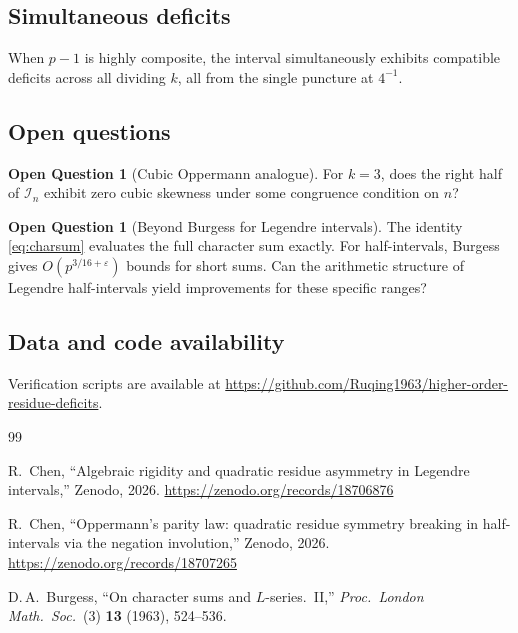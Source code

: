 \documentclass[11pt, a4paper]{article}
\theoremstyle{definition}
\newtheorem{question}[theorem]{Open Question}
\theoremstyle{remark}
\begin{document}
\subsection{Simultaneous deficits}

When $p - 1$ is highly composite, the interval
simultaneously exhibits compatible deficits across
all dividing $k$, all from the single puncture
at $4^{-1}$.

\subsection{Open questions}

\begin{question}[Cubic Oppermann analogue]
For $k = 3$, does the right half of $\mathcal{I}_n$
exhibit zero cubic skewness under some congruence
condition on $n$?
\end{question}

\begin{question}[Beyond Burgess for Legendre intervals]
The identity \eqref{eq:charsum} evaluates the full
character sum exactly.
For half-intervals, Burgess \cite{Burgess1963} gives
$O(p^{3/16 + \varepsilon})$ bounds for short sums.
Can the arithmetic structure of Legendre half-intervals
yield improvements for these specific ranges?
\end{question}

\subsection*{Data and code availability}

Verification scripts are available at
\url{https://github.com/Ruqing1963/higher-order-residue-deficits}.

\begin{thebibliography}{99}

  R.~Chen,
  ``Algebraic rigidity and quadratic residue asymmetry
  in Legendre intervals,''
  Zenodo, 2026.
  \url{https://zenodo.org/records/18706876}

  R.~Chen,
  ``Oppermann's parity law: quadratic residue symmetry
  breaking in half-intervals via the negation involution,''
  Zenodo, 2026.
  \url{https://zenodo.org/records/18707265}

  D.\,A.~Burgess,
  ``On character sums and $L$-series.\ II,''
  \textit{Proc.\ London Math.\ Soc.}\ (3) \textbf{13}
  (1963), 524--536.

\end{thebibliography}
\end{document}
